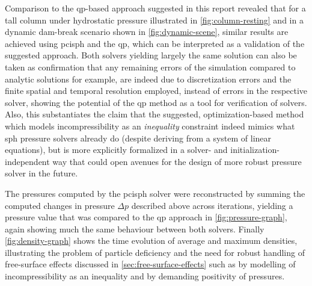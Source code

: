 \documentclass[conference]{IEEEtran}
\begin{document}
Comparison to the \ac{qp}-based approach suggested in this report revealed that for a tall column under hydrostatic pressure illustrated in \autoref{fig:column-resting} and in a dynamic dam-break scenario shown in \autoref{fig:dynamic-scene}, similar results are achieved using \ac{pcisph} and the \ac{qp}, which can be interpreted as a validation of the suggested approach. Both solvers yielding largely the same solution can also be taken as confirmation that any remaining errors of the simulation compared to analytic solutions for example, are indeed due to discretization errors and the finite spatial and temporal resolution employed, instead of errors in the respective solver, showing the potential of the \ac{qp} method as a tool for verification of solvers. Also, this substantiates the claim that the suggested, optimization-based method which models incompressibility as an \textit{inequality} constraint indeed mimics what \ac{sph} pressure solvers already do (despite deriving from a system of linear equations), but is more explicitly formalized in a solver- and initialization-independent way that could open avenues for the design of more robust pressure solver in the future.

The pressures computed by the \ac{pcisph} solver were reconstructed by summing the computed changes in pressure $\Delta p$ described above across iterations, yielding a pressure value that was compared to the \ac{qp} approach in \autoref{fig:pressure-graph}, again showing much the same behaviour between both solvers. Finally \autoref{fig:density-graph} shows the time evolution of average and maximum densities, illustrating the problem of particle deficiency and the need for robust handling of free-surface effects discussed in \autoref{sec:free-surface-effects} such as by modelling of incompressibility as an inequality and by demanding positivity of pressures.
\end{document}
